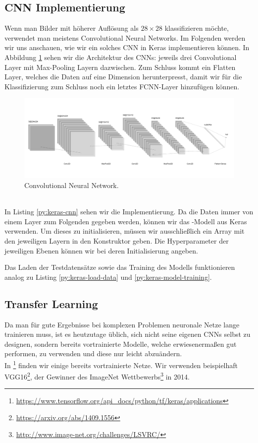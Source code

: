 \subsection{CNN Implementierung}
Wenn man Bilder mit höherer Auflösung als \(28\times 28\) klassifizieren möchte, verwendet man 
meistens Convolutional Neural Networks. Im Folgenden werden wir uns anschauen, wie wir ein solches CNN in Keras 
implementieren können. In Abbildung \ref{fig:cnn} sehen wir die Architektur des CNNs: jeweils drei Convolutional Layer 
mit Max-Pooling Layern dazwischen. Zum Schluss kommt ein Flatten Layer, welches die Daten auf eine Dimension herunterpresst, 
damit wir für die Klassifizierung zum Schluss noch ein letztes FCNN-Layer hinzufügen können.\\
\begin{figure}[htbp]
    \centering
    \includegraphics[width=.9\textwidth]{figures/cnn}
    \caption{Convolutional Neural Network.}
    \label{fig:cnn}
\end{figure}\\
In Listing \ref{py:keras-cnn} sehen wir die Implementierung. Da die Daten immer von einem Layer zum 
Folgenden gegeben werden, können wir das -Modell aus Keras verwenden. 
Um dieses zu initialisieren, müssen wir ausschließlich ein Array mit den jeweiligen Layern in den 
Konstruktor geben. Die Hyperparameter der jeweiligen Ebenen können wir bei deren Initialisierung angeben.


Das Laden der Testdatensätze sowie das Training des Modells funktionieren analog zu Listing \ref{py:keras-load-data} 
und \ref{py:keras-model-training}. 

\newpage

\subsection{Transfer Learning}
Da man für gute Ergebnisse bei komplexen Problemen neuronale Netze lange trainieren muss, 
ist es heutzutage üblich, sich nicht seine eigenen CNNs selbst zu designen, sondern bereits vortrainierte 
Modelle, welche erwiesenermaßen gut performen, zu verwenden und diese nur leicht abzuändern. \\
In \footnote{\url{https://www.tensorflow.org/api_docs/python/tf/keras/applications}}
finden wir einige bereits vortrainierte Netze. Wir verwenden beispielhaft VGG16\footnote{\url{https://arxiv.org/abs/1409.1556}}, 
der Gewinner des ImageNet Wettbewerbs\footnote{\url{http://www.image-net.org/challenges/LSVRC/}} in 2014. 

